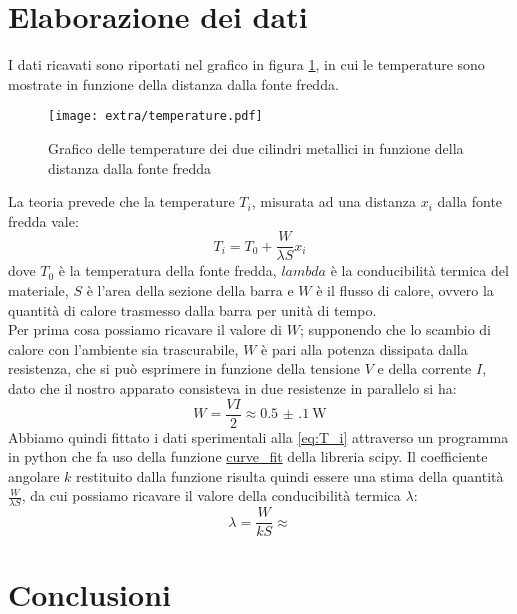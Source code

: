 \documentclass{article}
\begin{document}
    \section{Elaborazione dei dati}
    I dati ricavati sono riportati nel grafico in figura \ref{fig:temperature}, in cui le temperature sono
    mostrate in funzione della distanza dalla fonte fredda.\\
    \begin{figure}[t]
        \centering
        \texttt{[image: extra/temperature.pdf]}
        \caption{Grafico delle temperature dei due cilindri metallici in funzione della
        distanza dalla fonte fredda}
        \label{fig:temperature}
    \end{figure}
    La teoria prevede che la temperature $T_i$, misurata ad una distanza $x_i$ dalla
    fonte fredda vale:
    \begin{equation}
        \label{eq:T_i}
        T_i=T_0+\frac{W}{ \lambda S}x_i
    \end{equation}
    dove $T_0$ è la temperatura della fonte fredda, 
    $lambda$ è la conducibilità termica del materiale,
    $S$ è l'area della sezione della barra e 
    $W$ è il flusso di calore, ovvero la quantità di calore trasmesso dalla barra per 
    unità di tempo.\\
    Per prima cosa possiamo ricavare il valore di $W$; supponendo che lo scambio di calore
    con l'ambiente sia trascurabile, $W$ è pari alla potenza dissipata dalla resistenza,
    che si può esprimere in funzione della tensione $V$ e della corrente $I$,
    dato che il nostro apparato consisteva in due resistenze in parallelo si ha:
    \begin{equation}
        W=\frac{VI}{2}\approx\SI{0.5(1)}{\watt}
    \end{equation}
    Abbiamo quindi fittato i dati sperimentali alla \ref{eq:T_i} attraverso un programma
    in python che fa uso della funzione 
    \href{https://docs.scipy.org/doc/scipy/reference/generated/scipy.optimize.curve_fit.html}{curve\_fit}
    della libreria scipy. 
    Il coefficiente angolare $k$ restituito dalla funzione risulta quindi essere una
    stima della quantità $\frac{W}{ \lambda S}$, da cui possiamo ricavare il valore
    della conducibilità termica $\lambda$:
     \begin{equation}
        \lambda= \frac{W}{kS}\approx
    \end{equation}

    \section{Conclusioni}
\end{document}
